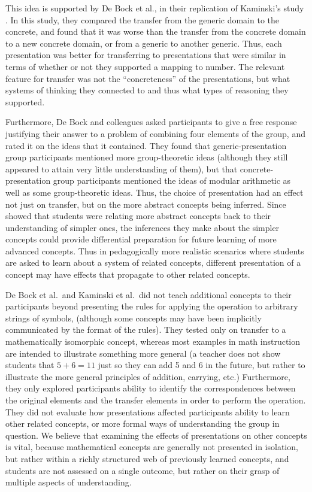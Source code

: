 \documentclass[man,10pt]{apa6}
\begin{document}
This idea is supported by De Bock et al., in their replication of Kaminski's study \cite{DeBock2011}. In this study, they compared the transfer from the generic domain to the concrete, and found that it was worse than the transfer from the concrete domain to a new concrete domain, or from a generic to another generic. Thus, each presentation was better for transferring to presentations that were similar in terms of whether or not they supported a mapping to number. The relevant feature for transfer was not the ``concreteness'' of the presentations, but what systems of thinking they connected to and thus what types of reasoning they supported.\par
Furthermore, De Bock and colleagues asked participants to give a free response justifying their answer to a problem of combining four elements of the group, and rated it on the ideas that it contained. They found that generic-presentation group participants mentioned more group-theoretic ideas (although they still appeared to attain very little understanding of them), but that concrete-presentation group participants mentioned the ideas of modular arithmetic as well as some group-theoretic ideas. Thus, the choice of presentation had an effect not just on transfer, but on the more abstract concepts being inferred. Since  showed that students were relating more abstract concepts back to their understanding of simpler ones, the inferences they make about the simpler concepts could provide differential preparation for future learning \cite{Bransford1999} of more advanced concepts. Thus in pedagogically more realistic scenarios where students are asked to learn about a system of related concepts, different presentation of a concept may have effects that propagate to other related concepts. \par
De Bock et al.\ and Kaminski et al.\ did not teach additional concepts to their participants beyond presenting the rules for applying the operation to arbitrary strings of symbols, (although some concepts may have been implicitly communicated by the format of the rules). They tested only on transfer to a mathematically isomorphic concept, whereas most examples in math instruction are intended to illustrate something more general (a teacher does not show students that $5+6 = 11$ just so they can add 5 and 6 in the future, but rather to illustrate the more general principles of addition, carrying, etc.) Furthermore, they only explored participants ability to identify the correspondences between the original elements and the transfer elements in order to perform the operation. They did not evaluate how presentations affected participants ability to learn other related concepts, or more formal ways of understanding the group in question. We believe that examining the effects of presentations on other concepts is vital, because mathematical concepts are generally not presented in isolation, but rather within a richly structured web of previously learned concepts, and students are not assessed on a single outcome, but rather on their grasp of multiple aspects of understanding.  
\end{document}
